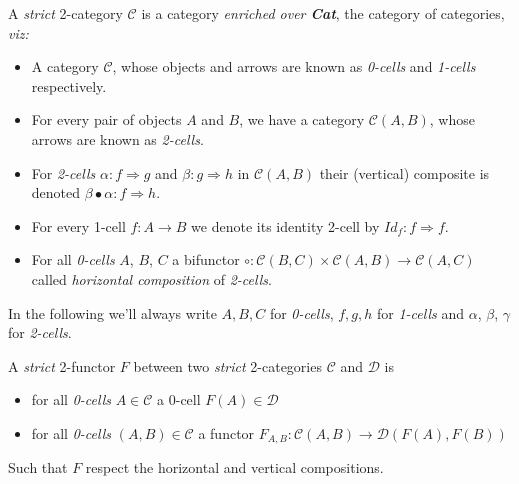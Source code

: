 \documentclass[a4paper]{article}
\begin{document}
\begin{definition}  \label{def:strict-two-cat}
  A \emph{strict} 2-category $\mathcal{C}$ is a category \emph{enriched over
    \textbf{Cat}}, the category of categories, \emph{viz:}
  \begin{itemize}
    \item A category $\mathcal{C}$, whose objects and arrows are known as
      \emph{0-cells} and \emph{1-cells} respectively.
    \item For every pair of objects $A$ and $B$, we have a
      category $\mathcal{C}(A, B)$, whose arrows are known as \emph{2-cells}.
    \item For \emph{2-cells} $\alpha : f \Rightarrow g$ and $\beta : g
      \Rightarrow h$ in $\mathcal{C}(A,B)$ their (vertical) composite is denoted
      $\beta \bullet \alpha : f \Rightarrow h$.
    \item For every 1-cell $f:A\to B$ we denote its identity 2-cell by
      $Id_f:f \Rightarrow f$.
    \item For all \emph{0-cells} $A$, $B$, $C$ a bifunctor $\circ:
      \mathcal{C}(B, C) \times \mathcal{C}(A, B) \to \mathcal{C}(A, C)$ called
      \emph{horizontal composition} of \emph{2-cells}.
  \end{itemize}
\end{definition}

\noindent
In the following we'll always write $A, B, C$ for \emph{0-cells}, $f,
g, h$ for \emph{1-cells} and $\alpha$, $\beta$, $\gamma$ for
\emph{2-cells}.

\begin{definition} \label{def:two-functor}
  A \emph{strict} 2-functor $F$ between two \emph{strict} 2-categories
    $\mathcal{C}$ and $\mathcal{D}$ is
  \begin{itemize}
    \item for all \emph{0-cells} $A \in \mathcal{C}$ a 0-cell $F(A) \in
      \mathcal{D}$
    \item for all \emph{0-cells} $(A, B) \in \mathcal{C}$ a functor $F_{A, B}:
      \mathcal{C}(A, B) \to \mathcal{D}(F(A), F(B))$
  \end{itemize}

  \noindent
  Such that $F$ respect the horizontal and vertical compositions.
\end{definition}
\end{document}
